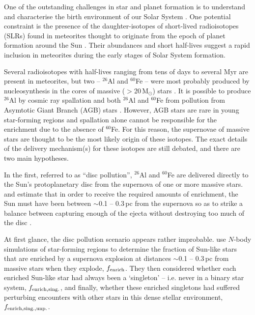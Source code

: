 \documentclass[useAMS,usenatbib,usegraphicx]{mn2e}
\begin{document}
One of the outstanding challenges in star and planet formation is to understand and characterise the birth environment of our Solar System \citep[e.g.][]{Adams10,Pfalzner15b}. One potential constraint is the presence of the daughter-isotopes of short-lived radioisotopes (SLRs) found in meteorites thought to originate from the epoch of planet formation around the Sun \citep{Lee76}.  Their abundances and short half-lives suggest a rapid inclusion in meteorites during the early stages of Solar System formation.

Several radioisotopes with half-lives ranging from tens of days to several Myr are present in meteorites, but two -- $^{26}$Al and $^{60}$Fe -- were most probably produced by nucleosynthesis in the cores of massive ($>$20\,M$_\odot$) stars \citep{Goswami04}. It is possible to produce $^{26}$Al by cosmic ray spallation \citep{Lee98,Shu01} and both $^{26}$Al and $^{60}$Fe  from pollution from Asymtotic Giant Branch (AGB) stars \citep{Busso99}. However, AGB stars are rare in young star-forming regions \citep{Kastner94} and spallation alone cannot be responsible for the enrichment due to the absence of  $^{60}$Fe. For this reason, the supernovae of massive stars are thought to be the most likely origin of these isotopes. The exact details of the delivery mechanism(s) for these isotopes are still debated, and there are two main hypotheses.

In the first, referred to as ``disc pollution'', $^{26}$Al and $^{60}$Fe are delivered directly to the Sun's protoplanetary disc from the supernova of one or more massive stars. \citet{Chevalier00} and \citet{Ouellette07} estimate that in order to receive the required amounts of enrichment, the Sun must have been between $\sim$0.1 -- 0.3\,pc from the supernova so as to strike a balance between capturing enough of the ejecta without destroying too much of the disc \citep[e.g.][]{Armitage00,Scally01,Adams04}. 

At first glance, the disc pollution scenario  appears rather improbable. \citet{Parker14a} use $N$-body simulations of star-forming regions to determine the fraction of Sun-like stars that are enriched by a supernova explosion at distances $\sim$0.1 -- 0.3\,pc from massive stars when they explode, $f_{\rm enrich}$. They then considered whether each enriched Sun-like star had always been a `singleton' \citep{Malmberg07b} -- i.e. never in a binary star system, $f_{\rm enrich, sing.}$, and finally, whether these enriched singletons had suffered perturbing encounters  with other stars in this dense stellar environment, $f_{\rm enrich, sing., unp.}$. 
\end{document}
